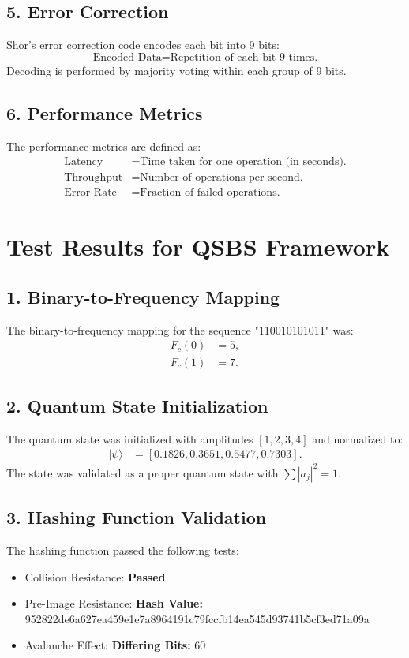 \documentclass{article}
\begin{document}
\subsection*{5. Error Correction}
Shor's error correction code encodes each bit into 9 bits:
\begin{equation}
\text{Encoded Data} = \text{Repetition of each bit 9 times.}
\end{equation}
Decoding is performed by majority voting within each group of 9 bits.

\subsection*{6. Performance Metrics}
The performance metrics are defined as:
\begin{align}
\text{Latency} &= \text{Time taken for one operation (in seconds).} \\
\text{Throughput} &= \text{Number of operations per second.} \\
\text{Error Rate} &= \text{Fraction of failed operations.}
\end{align}

\section*{Test Results for QSBS Framework}

\subsection*{1. Binary-to-Frequency Mapping}
The binary-to-frequency mapping for the sequence "110010101011" was:
\begin{align*}
F_c(0) &= 5, \\
F_c(1) &= 7.
\end{align*}

\subsection*{2. Quantum State Initialization}
The quantum state was initialized with amplitudes $[1, 2, 3, 4]$ and normalized to:
\begin{align*}
|\psi\rangle &= [0.1826, 0.3651, 0.5477, 0.7303].
\end{align*}
The state was validated as a proper quantum state with $\sum |a_j|^2 = 1$.

\subsection*{3. Hashing Function Validation}
The hashing function passed the following tests:
\begin{itemize}
    \item Collision Resistance: \textbf{Passed}
    \item Pre-Image Resistance: \textbf{Hash Value:} 952822de6a627ea459e1e7a8964191c79fccfb14ea545d93741b5cf3ed71a09a
    \item Avalanche Effect: \textbf{Differing Bits:} 60
\end{itemize}
\end{document}
